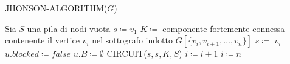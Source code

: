 \begin{algorithm}[H]
    \caption{JHONSON-ALGORITHM($G$)}\label{alg:jhonson-algorithm}
    \begin{algorithmic}[1]
        \State Sia $S$ una pila di nodi vuota
        \State $s \coloneqq v_1$
            \State $K \coloneqq$ componente fortemente connessa contenente il vertice $v_i$
            nel sottografo indotto $G[\{v_i, v_{i+1}, \ldots, v_n\}]$
                \State $s \coloneqq $ $v_i$
                    \State $u.blocked \coloneqq false$
                    \State $u.B \coloneqq \emptyset$
                \EndFor
                \State CIRCUIT($s, s, K, S$)
                \State $i \coloneqq i + 1$
            \Else
                \State $i \coloneqq n$
            \EndIf
        \EndWhile
    \end{algorithmic}
\end{algorithm}